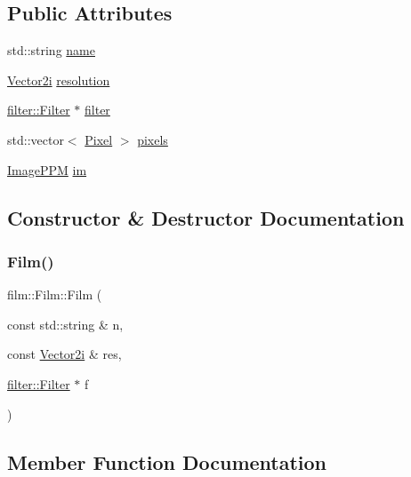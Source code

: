 \subsection*{Public Attributes}
\begin{DoxyCompactItemize}
\item 
std\+::string \mbox{\hyperlink{classfilm_1_1Film_afe6ec2d1649ef253c027e2773c22bd88}{name}}
\item 
\mbox{\hyperlink{cyclop_8hpp_ac9c6c66d543f1c0c5bc66579727dae30}{Vector2i}} \mbox{\hyperlink{classfilm_1_1Film_ac4f1015b0be5846fa685db493474e161}{resolution}}
\item 
\mbox{\hyperlink{classfilter_1_1Filter}{filter\+::\+Filter}} $\ast$ \mbox{\hyperlink{classfilm_1_1Film_a53fd3893ba73d6e88ba7d5f8a8dba890}{filter}}
\item 
std\+::vector$<$ \mbox{\hyperlink{structfilm_1_1Pixel}{Pixel}} $>$ \mbox{\hyperlink{classfilm_1_1Film_a53c27dc92a966e18407dafacb53be199}{pixels}}
\item 
\mbox{\hyperlink{classImagePPM}{Image\+P\+PM}} \mbox{\hyperlink{classfilm_1_1Film_ac076318872d910da8becb1eae0c511f6}{im}}
\end{DoxyCompactItemize}


\subsection{Constructor \& Destructor Documentation}
\mbox{\label{classfilm_1_1Film_aec1ee55b697f6f9828d4fe761ef2ce9c}} 
\subsubsection{\texorpdfstring{Film()}{Film()}}
{\footnotesize\ttfamily film\+::\+Film\+::\+Film (\begin{DoxyParamCaption}\item[{const std\+::string \&}]{n,  }\item[{const \mbox{\hyperlink{cyclop_8hpp_ac9c6c66d543f1c0c5bc66579727dae30}{Vector2i}} \&}]{res,  }\item[{\mbox{\hyperlink{classfilter_1_1Filter}{filter\+::\+Filter}} $\ast$}]{f }\end{DoxyParamCaption})}



\subsection{Member Function Documentation}
\mbox{\label{classfilm_1_1Film_aac2f3224d0e20d1b5ebe92583354644a}} 
